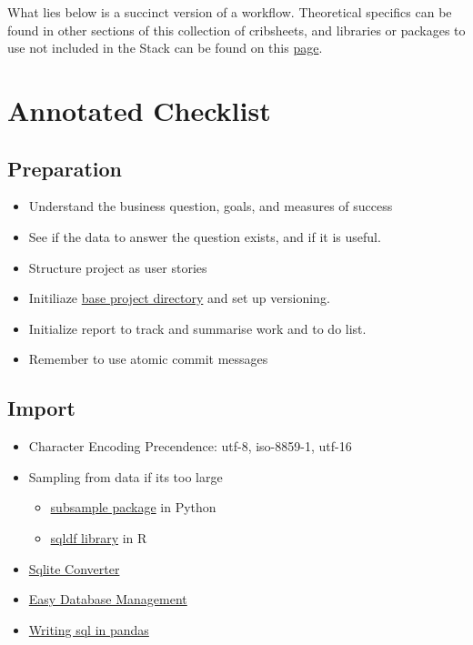 \documentclass[]{book}
\providecommand{\tightlist}{%
  \setlength{\itemsep}{0pt}\setlength{\parskip}{0pt}}
\theoremstyle{definition}
\theoremstyle{definition}
\theoremstyle{definition}
\theoremstyle{remark}
\begin{document}
What lies below is a succinct version of a workflow. Theoretical
specifics can be found in other sections of this collection of
cribsheets, and libraries or packages to use not included in the Stack
can be found on this
\href{https://gfleetwood.github.io/noted-resources/data_science.html}{page}.

\section{Annotated Checklist}\label{annotated-checklist}

\subsection{Preparation}\label{preparation}

\begin{itemize}
\item
  Understand the business question, goals, and measures of success
\item
  See if the data to answer the question exists, and if it is useful.
\item
  Structure project as user stories
\item
  Initiliaze
  \href{https://github.com/gfleetwood/ds-crib-sheet/blob/master/other/setup_project.R}{base
  project directory} and set up versioning.
\item
  Initialize report to track and summarise work and to do list.
\item
  Remember to use atomic commit messages
\end{itemize}

\subsection{Import}\label{import}

\begin{itemize}
\item
  Character Encoding Precendence: utf-8, iso-8859-1, utf-16
\item
  Sampling from data if its too large

  \begin{itemize}
  \tightlist
  \item
    \href{https://pypi.python.org/pypi/subsample}{subsample package} in
    Python
  \item
    \href{https://stackoverflow.com/a/22262726/6627726}{sqldf library}
    in R
  \end{itemize}
\item
  \href{https://github.com/thombashi/sqlitebiter}{Sqlite Converter}
\item
  \href{https://dataset.readthedocs.io/en/latest/}{Easy Database
  Management}
\item
  \href{https://github.com/yhat/pandasql}{Writing sql in pandas}
\end{itemize}
\end{document}
